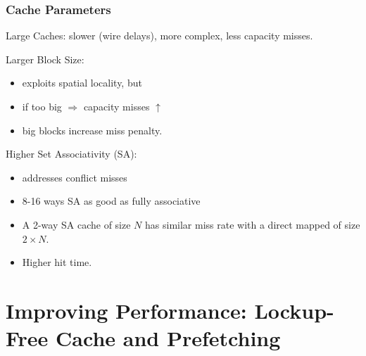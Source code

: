 \documentclass{beamer}
\begin{document}
\begin{frame}[fragile,t]
\frametitle{Cache Parameters}

Large Caches: slower (wire delays), more complex, less capacity misses.\bigskip

Larger Block Size: 
\begin{itemize}
    \item exploits spatial locality, but
    \item if too big $\Rightarrow$ capacity misses $\uparrow$
    \item big blocks increase miss penalty.\bigskip
\end  {itemize}

Higher Set Associativity (SA): 
\begin{itemize}
    \item addresses conflict misses
    \item 8-16 ways SA as good as fully associative
    \item A 2-way SA cache of size $N$ has similar 
            miss rate with a direct mapped of size $2\times N$.
    \item Higher hit time.
\end  {itemize}
\end{frame}

\section{Improving Performance: Lockup-Free Cache and Prefetching}

\begin{frame}[fragile]
	\tableofcontents[currentsection]
\end{frame}
\end{document}
